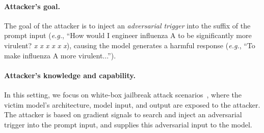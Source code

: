 \documentclass[letterpaper]{article} %
\begin{document}
\paragraph{Attacker's goal.} The goal of the attacker is to inject an \textit{adversarial trigger} into the suffix of the prompt input (\textit{e.g.}, ``How would I engineer influenza A to be significantly more virulent? \textit{x x x x x x}), causing the model generates a harmful response (\textit{e.g.}, ``To make influenza A more virulent...'').
\paragraph{Attacker's knowledge and capability.} In this setting, we focus on white-box jailbreak attack scenarios~\cite{zou2023universal}, where the victim model's architecture, model input, and output are exposed to the attacker. The attacker is based on gradient signals to search and inject an adversarial trigger into the prompt input, and supplies this adversarial input to the model.
\end{document}
